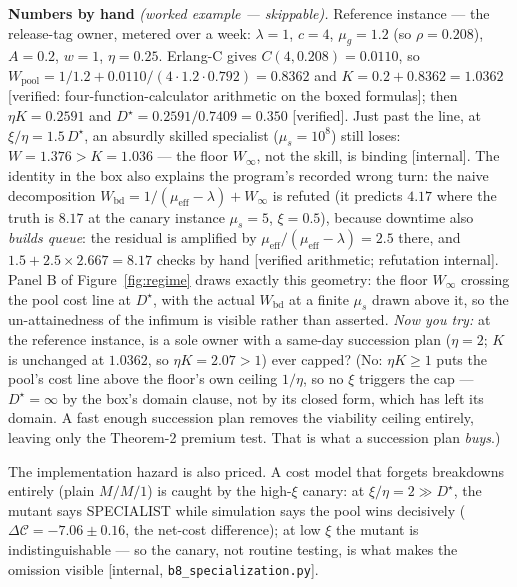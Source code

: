 \documentclass[11pt,a4paper]{article}
\begin{document}
\begin{worked}
\noindent\textbf{Numbers by hand} \emph{(worked example --- skippable).} Reference instance --- the release-tag owner, metered
over a week: $\lambda{=}1$, $c{=}4$, $\mu_g{=}1.2$ (so $\rho=0.208$), $A{=}0.2$, $w{=}1$,
$\eta{=}0.25$. Erlang-C gives $C(4,0.208)=0.0110$, so $W_{\mathrm{pool}}=1/1.2+0.0110/(4\cdot1.2\cdot0.792)=0.8362$ and
$K=0.2+0.8362=1.0362$ [verified: four-function-calculator arithmetic on the boxed formulas]; then $\eta K = 0.2591$ and
$D^\star = 0.2591/0.7409 = 0.350$ [verified]. Just past the line, at $\xi/\eta = 1.5\,D^\star$, an absurdly skilled specialist
($\mu_s=10^8$) still loses: $W=1.376 > K=1.036$ --- the floor $W_\infty$, not the skill, is binding [internal]. The identity in
the box also explains the program's recorded wrong turn: the naive decomposition $W_{\mathrm{bd}} =
1/(\mu_{\mathrm{eff}}-\lambda) + W_\infty$ is refuted (it predicts $4.17$ where the truth is $8.17$ at the canary instance
$\mu_s{=}5$, $\xi{=}0.5$), because downtime also \emph{builds queue}: the residual is amplified by
$\mu_{\mathrm{eff}}/(\mu_{\mathrm{eff}}-\lambda) = 2.5$ there, and $1.5 + 2.5\times2.667 = 8.17$ checks by hand [verified
arithmetic; refutation internal]. Panel B of Figure~\ref{fig:regime} draws exactly this geometry: the floor $W_\infty$ crossing
the pool cost line at $D^\star$, with the actual $W_{\mathrm{bd}}$ at a finite $\mu_s$ drawn above it, so the un-attainedness of
the infimum is visible rather than asserted. \emph{Now you try:} at the reference instance, is a sole owner with a same-day
succession plan ($\eta=2$; $K$ is unchanged at $1.0362$, so $\eta K = 2.07 > 1$) ever capped? (No: $\eta K \ge 1$ puts the pool's
cost line above the floor's own ceiling $1/\eta$, so no $\xi$ triggers the cap --- $D^\star = \infty$ by the box's domain clause,
not by its closed form, which has left its domain. A fast enough succession plan removes the viability ceiling entirely, leaving
only the Theorem-2 premium test. That is what a succession plan \emph{buys}.)
\end{worked}

The implementation hazard is also priced. A cost model that forgets breakdowns entirely (plain $M/M/1$) is caught by the
high-$\xi$ canary: at $\xi/\eta=2 \gg D^\star$, the mutant says SPECIALIST while simulation says the pool wins decisively
($\Delta\mathcal{C} = -7.06 \pm 0.16$, the net-cost difference); at low $\xi$ the mutant is indistinguishable --- so the canary, not routine testing, is what makes
the omission visible [internal, \texttt{b8\_specialization.py}].
\end{document}
